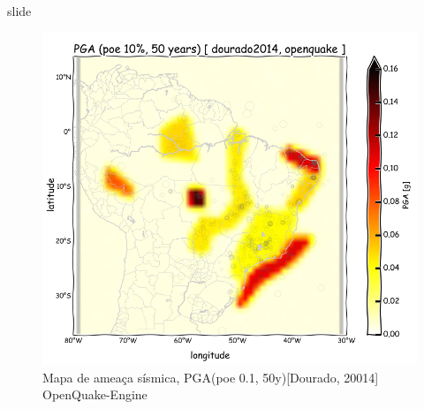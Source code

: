 \documentclass[ucs,8pt]{beamer}
\begin{document}
\begin{frame}{slide}

\begin{figure}[H]
  \centering
  \includegraphics[height=.80\textheight]{pga_dourado_oq} 
  \caption{Mapa de ameaça sísmica, PGA(poe 0.1, 50y)[Dourado, 20014] OpenQuake-Engine }
  \label{fig:pga_dourado_oq} 
\end{figure}

\end{frame}
\end{document}
